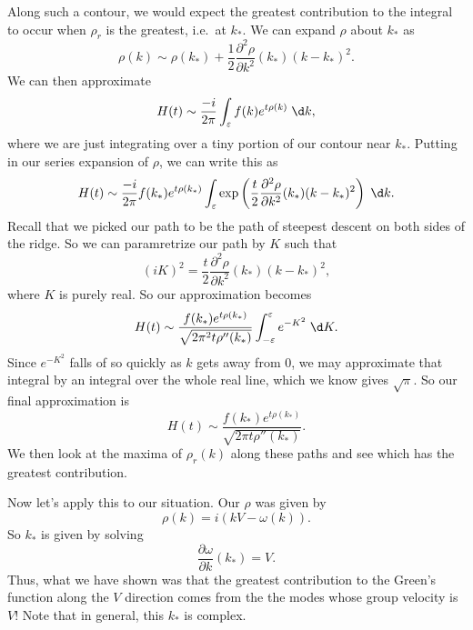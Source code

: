 \documentclass[a4paper]{article}
\begin{document}
Along such a contour, we would expect the greatest contribution to the integral to occur when $\rho_r$ is the greatest, i.e.\ at $k_*$. We can expand $\rho$ about $k_*$ as
%
%
%
%
\[
  \rho(k) \sim \rho(k_*) + \frac{1}{2} \frac{\partial^2 \rho}{\partial k^2} (k_*) (k - k_*)^2.
\]
We can then approximate
\[
  H(t) \sim \frac{-i}{2\pi}\int_{\varepsilon} f(k) e^{t \rho(k)}\;\d k,
\]
where we are just integrating over a tiny portion of our contour near $k_*$. Putting in our series expansion of $\rho$, we can write this as
\[
  H(t) \sim \frac{-i}{2\pi} f(k_*) e^{t\rho(k_*)} \int_{\varepsilon} \exp\left(\frac{t}{2} \frac{\partial^2 \rho}{\partial k^2} (k_*) (k - k_*)^2\right)\;\d k.
\]
Recall that we picked our path to be the path of steepest descent on both sides of the ridge. So we can paramretrize our path by $K$ such that
\[
  (iK)^2 = \frac{t}{2} \frac{\partial^2 \rho}{\partial k^2} (k_*) (k - k_*)^2,
\]
where $K$ is purely real. So our approximation becomes
\[
  H(t) \sim \frac{f(k_*) e^{t \rho(k_*)}}{\sqrt{2\pi^2 t \rho''(k_*)}} \int_{-\varepsilon}^\varepsilon e^{-K^2}\;\d K.
\]
Since $e^{-K^2}$ falls of so quickly as $k$ gets away from $0$, we may approximate that integral by an integral over the whole real line, which we know gives $\sqrt{\pi}$. So our final approximation is
\[
  H(t) \sim \frac{f(k_*) e^{t \rho(k_*)}}{\sqrt{2\pi t \rho''(k_*)}}.
\]
We then look at the maxima of $\rho_r(k)$ along these paths and see which has the greatest contribution.

Now let's apply this to our situation. Our $\rho$ was given by
\[
  \rho(k) = i (kV - \omega(k)).
\]
So $k_*$ is given by solving
\[
  \frac{\partial \omega}{\partial k}(k_*) = V.\tag{$*$}
\]
Thus, what we have shown was that the greatest contribution to the Green's function along the $V$ direction comes from the the modes whose group velocity is $V$! Note that in general, this $k_*$ is complex.
\end{document}
